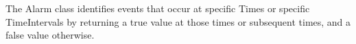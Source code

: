
\label{sec:Alarm}
The Alarm class identifies events that occur at specific Times
or specific TimeIntervals by returning a true value at those times
or subsequent times, and a false value otherwise.  

